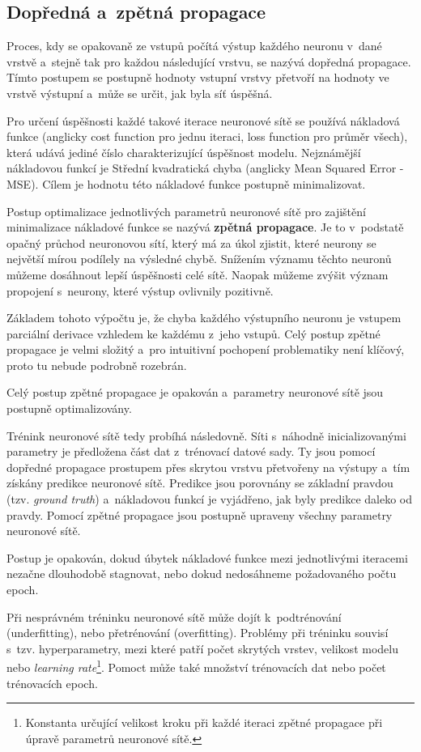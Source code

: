 \subsection{Dopředná a~zpětná propagace}
Proces, kdy se opakovaně ze vstupů počítá výstup každého neuronu v~dané vrstvě a~stejně tak pro každou následující vrstvu, se nazývá dopředná propagace. Tímto postupem se postupně hodnoty vstupní vrstvy přetvoří na hodnoty ve vrstvě výstupní a~může se určit, jak byla síť úspěšná.\par
Pro určení úspěšnosti každé takové iterace neuronové sítě se používá nákladová funkce (anglicky cost function pro jednu iteraci, loss function pro průměr všech), která udává jediné číslo charakterizující úspěšnost modelu. Nejznámější nákladovou funkcí je Střední kvadratická chyba (anglicky Mean Squared Error - MSE). Cílem je hodnotu této nákladové funkce postupně minimalizovat.\par \medskip
Postup optimalizace jednotlivých parametrů neuronové sítě pro zajištění minimalizace nákladové funkce se nazývá \textbf{zpětná propagace}. Je to v~podstatě opačný průchod neuronovou sítí, který má za úkol zjistit, které neurony se největší mírou podílely na výsledné chybě. Snížením významu těchto neuronů můžeme dosáhnout lepší úspěšnosti celé sítě. Naopak můžeme zvýšit význam propojení s~neurony, které výstup ovlivnily pozitivně.\par
Základem tohoto výpočtu je, že chyba každého výstupního neuronu je vstupem parciální derivace vzhledem ke každému z~jeho vstupů. Celý postup zpětné propagace je velmi složitý a~pro intuitivní pochopení problematiky není klíčový, proto tu nebude podrobně rozebrán.\par
Celý postup zpětné propagace je opakován a~parametry neuronové sítě jsou postupně optimalizovány.\par \medskip
Trénink neuronové sítě tedy probíhá následovně. Síti s~náhodně inicializovanými parametry je předložena část dat z~trénovací datové sady. Ty jsou pomocí dopředné propagace prostupem přes skrytou vrstvu přetvořeny na výstupy a~tím získány predikce neuronové sítě. Predikce jsou porovnány se základní pravdou (tzv. \emph{ground truth}) a~nákladovou funkcí je vyjádřeno, jak byly predikce daleko od pravdy. Pomocí zpětné propagace jsou postupně upraveny všechny parametry neuronové sítě.\par
Postup je opakován, dokud úbytek nákladové funkce mezi jednotlivými iteracemi nezačne dlouhodobě stagnovat, nebo dokud nedosáhneme požadovaného počtu epoch.\par
Při nesprávném tréninku neuronové sítě může dojít k~podtrénování (underfitting), nebo přetrénování (overfitting). Problémy při tréninku souvisí s~tzv. hyperparametry, mezi které patří počet skrytých vrstev, velikost modelu nebo \emph{learning rate}\footnote{Konstanta určující velikost kroku při každé iteraci zpětné propagace při úpravě parametrů neuronové sítě.}. Pomoct může také množství trénovacích dat nebo počet trénovacích epoch.

